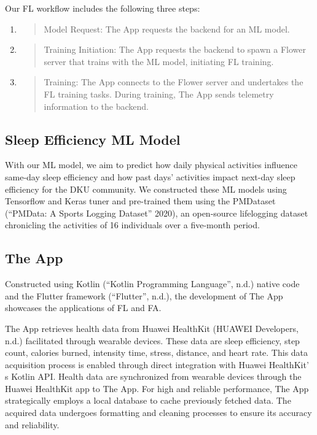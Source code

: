 \documentclass{article}
\begin{document}
\begin{multicols}{2}
Our FL workflow includes the following three steps:

\begin{enumerate}
\def\labelenumi{\arabic{enumi}.}
\item
  \begin{quote}
  Model Request: The App requests the backend for an ML model.
  \end{quote}
\item
  \begin{quote}
  Training Initiation: The App requests the backend to spawn a Flower
  server that trains with the ML model, initiating FL training.
  \end{quote}
\item
  \begin{quote}
  Training: The App connects to the Flower server and undertakes the FL
  training tasks. During training, The App sends telemetry information
  to the backend.
  \end{quote}
\end{enumerate}

\subsection{Sleep Efficiency ML Model}

With our ML model, we aim to predict how daily physical activities
influence same-day sleep efficiency and how past days'
activities impact next-day sleep efficiency for the DKU community. We
constructed these ML models using Tensorflow and Keras tuner and
pre-trained them using the PMDataset (``PMData: A Sports Logging
Dataset'' 2020), an open-source lifelogging dataset chronicling the
activities of 16 individuals over a five-month period.

\subsection{The App}

Constructed using Kotlin (``Kotlin Programming Language'', n.d.) native
code and the Flutter framework (``Flutter'', n.d.), the development of
The App showcases the applications of FL and FA.

The App retrieves health data from Huawei HealthKit (HUAWEI Developers,
n.d.) facilitated through wearable devices. These data are sleep
efficiency, step count, calories burned, intensity time, stress,
distance, and heart rate. This data acquisition process is enabled
through direct integration with Huawei HealthKit' s
Kotlin API. Health data are synchronized from wearable devices through
the Huawei HealthKit app to The App. For high and reliable performance,
The App strategically employs a local database to cache previously
fetched data. The acquired data undergoes formatting and cleaning
processes to ensure its accuracy and reliability.


\end{multicols}
\end{document}
